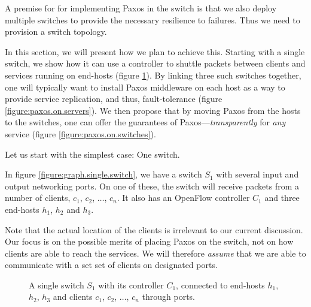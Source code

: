 A premise for for implementing Paxos in the switch is that we also deploy
multiple switches to provide the necessary resilience to failures.
%
Thus we need to provision a switch topology.

In this section, we will present how we plan to achieve this. 
%
Starting with a single switch, we show how it can use a controller to
shuttle packets between clients and services running on end-hosts (figure
\ref{figure:graph.single.switch}).
%
By linking three such switches together, one will typically want to install
Paxos middleware on each host as a way to provide service replication, and
thus, fault-tolerance (figure \ref{figure:paxos.on.servers}).
%
We then propose that by moving Paxos from the hosts to the
switches, one can offer the guarantees of Paxos---\textit{transparently} for
\textit{any} service (figure \ref{figure:paxos.on.switches}).

Let us start with the simplest case: One switch.

In figure
\vref{figure:graph.single.switch}, we have a switch $S_1$ with several
input and output networking ports.  On one of these, the switch
will receive packets from a number of clients, $c_1$, $c_2$, $\dots$, $c_n$.
%
It also has an OpenFlow controller $C_1$ and three end-hosts $h_1$, $h_2$ and
$h_3$.

Note that the actual location of the clients is irrelevant to our current
discussion.  Our focus is on the possible merits of placing Paxos on the
switch, not on how clients are able to reach the services. We will therefore
\textit{assume} that we are able to communicate with a set set of clients on
designated ports.

\begin{figure}[H]
  \centering
  \caption{A single switch $S_1$ with its controller $C_1$, connected
    to end-hosts $h_1$, $h_2$, $h_3$ and clients $c_1$, $c_2$, $\dots$, $c_n$
    through ports.}
  \label{figure:graph.single.switch}
\end{figure}

